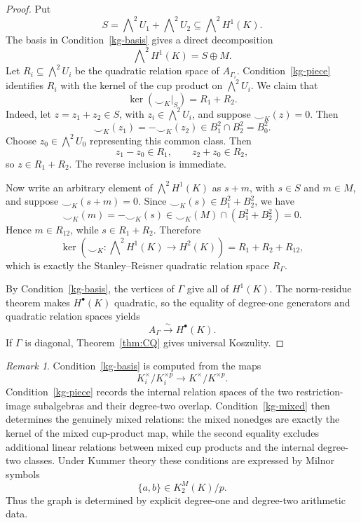 \documentclass[12pt]{amsart}
\theoremstyle{plain}
\theoremstyle{definition}
\theoremstyle{remark}
\newtheorem{remark}[theorem]{Remark}
\numberwithin{equation}{section}
\begin{document}
\begin{proof}
Put
\[
S=\bigwedge\nolimits^2 U_1+\bigwedge\nolimits^2 U_2
\subseteq \bigwedge\nolimits^2 H^1(K).
\]
The basis in Condition~\ref{kg-basis} gives a direct decomposition
\[
\bigwedge\nolimits^2 H^1(K)=S\oplus M.
\]
Let \(R_i\subseteq\bigwedge^2U_i\) be the quadratic relation space of
\(A_{\Gamma_i}\). Condition~\ref{kg-piece} identifies
\(R_i\) with the kernel of the cup product on \(\bigwedge^2U_i\).
We claim that
\[
\ker(\smile_K|_S)=R_1+R_2.
\]
Indeed, let \(z=z_1+z_2\in S\), with
\(z_i\in\bigwedge^2U_i\), and suppose \(\smile_K(z)=0\). Then
\[
\smile_K(z_1)=-\smile_K(z_2)
\in B_1^2\cap B_2^2=B_0^2.
\]
Choose \(z_0\in\bigwedge^2U_0\) representing this common class. Then
\[
z_1-z_0\in R_1,
\qquad
z_2+z_0\in R_2,
\]
so \(z\in R_1+R_2\). The reverse inclusion is immediate.

Now write an arbitrary element of \(\bigwedge^2H^1(K)\) as
\(s+m\), with \(s\in S\) and \(m\in M\), and suppose
\(\smile_K(s+m)=0\). Since \(\smile_K(s)\in B_1^2+B_2^2\), we have
\[
\smile_K(m)=-\smile_K(s)
\in \smile_K(M)\cap(B_1^2+B_2^2)=0.
\]
Hence \(m\in R_{12}\), while \(s\in R_1+R_2\). Therefore
\[
\ker\!\left(
\smile_K:\bigwedge\nolimits^2H^1(K)\longrightarrow H^2(K)
\right)
=R_1+R_2+R_{12},
\]
which is exactly the Stanley--Reisner quadratic relation space
\(R_\Gamma\).

By Condition~\ref{kg-basis}, the vertices of \(\Gamma\) give all
of \(H^1(K)\). The norm-residue theorem makes \(H^\bullet(K)\)
quadratic, so the equality of degree-one generators and quadratic
relation spaces yields
\[
A_\Gamma\overset{\sim}{\longrightarrow}H^\bullet(K).
\]
If \(\Gamma\) is diagonal, Theorem~\ref{thm:CQ} gives universal
Koszulity.
\end{proof}

\begin{remark}
\label{rem:kummer-arithmetic}
Condition~\ref{kg-basis} is computed from the maps
\[
K_i^\times/K_i^{\times p}\longrightarrow K^\times/K^{\times p}.
\]
Condition~\ref{kg-piece} records the internal relation spaces of the two
restriction-image subalgebras and their degree-two overlap. Condition~\ref{kg-mixed} then determines the genuinely mixed relations: the mixed
nonedges are exactly the kernel of the mixed cup-product map, while the
second equality excludes additional linear relations between mixed cup
products and the internal degree-two classes. Under Kummer theory these
conditions are expressed by Milnor symbols
\[
\{a,b\}\in K_2^M(K)/p.
\]
Thus the graph is determined by explicit degree-one and degree-two arithmetic
data.
\end{remark}
\end{document}
